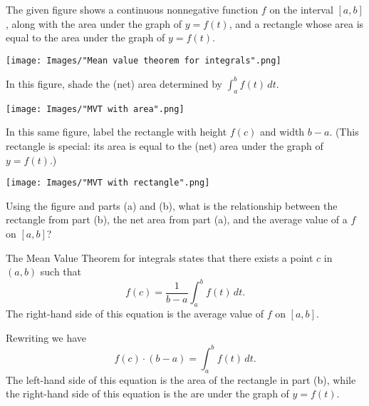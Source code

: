 \documentclass[handout, nooutcomes]{ximera}
\renewenvironment{freeResponse}{
\ifhandout\setbox0\vbox\bgroup\else
\begin{trivlist}\item[\hskip \labelsep\bfseries Solution:\hspace{2ex}]
\fi}
{\ifhandout\egroup\else
\end{trivlist}
\fi}
\renewcommand{\d}{\,d}
\begin{document}
\begin{problem}
  The given figure shows a continuous nonnegative function $f$ on the interval $[a, b]$, along with the area under the graph of $y = f(t)$, and a rectangle whose area is equal to the area under the graph of $y = f(t)$.

  \begin{image}
    \texttt{[image: Images/"Mean value theorem for integrals".png]}
  \end{image}
  \begin{itemize}
    \item[(a)]
      In this figure, shade the (net) area determined by $\int_a^b f(t) \d t$.
      \begin{freeResponse}
          \begin{image}
            \texttt{[image: Images/"MVT with area".png]}
          \end{image}
      \end{freeResponse}

    \item[(b)]
      In this same figure, label the rectangle with height $f(c)$ and width $b - a$.
      (This rectangle is special: its area is equal to the (net) area under the graph of $y = f(t)$.)
      \begin{freeResponse}
          \begin{image}
            \texttt{[image: Images/"MVT with rectangle".png]}
          \end{image}
      \end{freeResponse}
    \item[(c)]
      Using the figure and parts (a) and (b), what is the relationship between the rectangle from part (b), the net area from part (a), and the average value of a $f$ on $[a, b]$?
      \begin{freeResponse}
        The Mean Value Theorem for integrals states that there exists a point $c$ in $(a, b)$ such that
        \[
          f(c) = \frac{1}{b-a}\int_a^b f(t) \d t.
        \]
        The right-hand side of this equation is the average value of $f$ on $[a, b]$.

        Rewriting we have
        \[
        f(c) \cdot (b-a) = \int_a^b f(t) \d t.
        \]
        The left-hand side of this equation is the area of the rectangle in part (b), while the right-hand side of this equation is the are under the graph of $y = f(t)$.
      \end{freeResponse}

  \end{itemize}
\end{problem}
\end{document}
